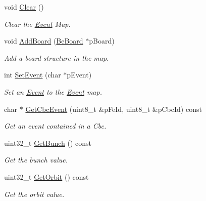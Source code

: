 \begin{CompactItemize}
void \hyperlink{class_ph2___hw_interface_1_1_event_c324585a7a75fb07c51e71317e53ea64}{Clear} ()
\begin{CompactList}\small\item\em Clear the \hyperlink{class_ph2___hw_interface_1_1_event}{Event} Map. \item\end{CompactList}\item 
void \hyperlink{class_ph2___hw_interface_1_1_event_f3c69c800172c254f020628293c232b9}{Add\-Board} (\hyperlink{class_ph2___hw_description_1_1_be_board}{Be\-Board} $\ast$p\-Board)
\begin{CompactList}\small\item\em Add a board structure in the map. \item\end{CompactList}\item 
int \hyperlink{class_ph2___hw_interface_1_1_event_67bf8cfaeaec158907932be40b37601d}{Set\-Event} (char $\ast$p\-Event)
\begin{CompactList}\small\item\em Set an \hyperlink{class_ph2___hw_interface_1_1_event}{Event} to the \hyperlink{class_ph2___hw_interface_1_1_event}{Event} map. \item\end{CompactList}\item 
char $\ast$ \hyperlink{class_ph2___hw_interface_1_1_event_2ee5e2552a84cb78ae902436e0dd77f4}{Get\-Cbc\-Event} (uint8\_\-t \&p\-Fe\-Id, uint8\_\-t \&p\-Cbc\-Id) const 
\begin{CompactList}\small\item\em Get an event contained in a Cbc. \item\end{CompactList}\item 
uint32\_\-t \hyperlink{class_ph2___hw_interface_1_1_event_b577a18ce8a9edc17debb67ea8734530}{Get\-Bunch} () const 
\begin{CompactList}\small\item\em Get the bunch value. \item\end{CompactList}\item 
uint32\_\-t \hyperlink{class_ph2___hw_interface_1_1_event_02d8bec5f5249cb80e2835e8aff037d7}{Get\-Orbit} () const 
\begin{CompactList}\small\item\em Get the orbit value. \item\end{CompactList}\item 

\end{CompactItemize}
